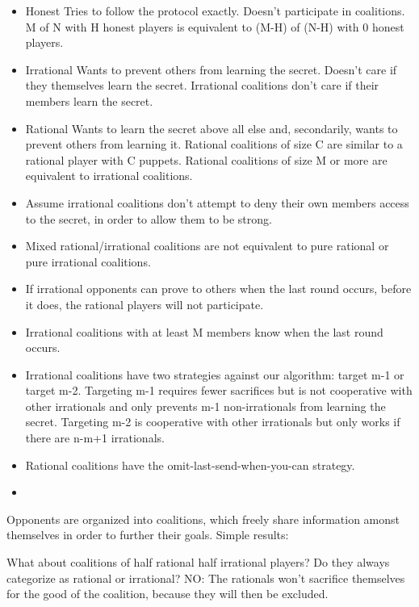 \documentclass{article}
\begin{document}
\begin{itemize}
  \item Honest
  \subitem Tries to follow the protocol exactly.
  \subitem Doesn't participate in coalitions.
  \subitem M of N with H honest players is equivalent to (M-H) of (N-H) with 0 honest players.
  \item Irrational
  \subitem Wants to prevent others from learning the secret. Doesn't care if they themselves learn the secret.
  \subitem Irrational coalitions don't care if their members learn the secret.
  \item Rational
  \subitem Wants to learn the secret above all else and, secondarily, wants to prevent others from learning it.
  \subitem Rational coalitions of size C are similar to a rational player with C puppets.
  \subitem Rational coalitions of size M or more are equivalent to irrational coalitions. 
\end{itemize}

\begin{itemize}
  \item Assume irrational coalitions don't attempt to deny their own members access to the secret, in order to allow them to be strong. 
  \item Mixed rational/irrational coalitions are not equivalent to pure rational or pure irrational coalitions.
  \item If irrational opponents can prove to others when the last round occurs, before it does, the rational players will not participate.
  \item Irrational coalitions with at least M members know when the last round occurs.
  \item Irrational coalitions have two strategies against our algorithm: target m-1 or target m-2. Targeting m-1 requires fewer sacrifices but is not cooperative with other irrationals and only prevents m-1 non-irrationals from learning the secret. Targeting m-2 is cooperative with other irrationals but only works if there are n-m+1 irrationals.
  \item Rational coalitions have the omit-last-send-when-you-can strategy.
  \item 
\end{itemize}
Opponents are organized into coalitions, which freely share information amonst themselves in order to further their goals. Simple results:

What about coalitions of half rational half irrational players? Do they always categorize as rational or irrational? NO: The rationals won't sacrifice themselves for the good of the coalition, because they will then be excluded.
\end{document}
